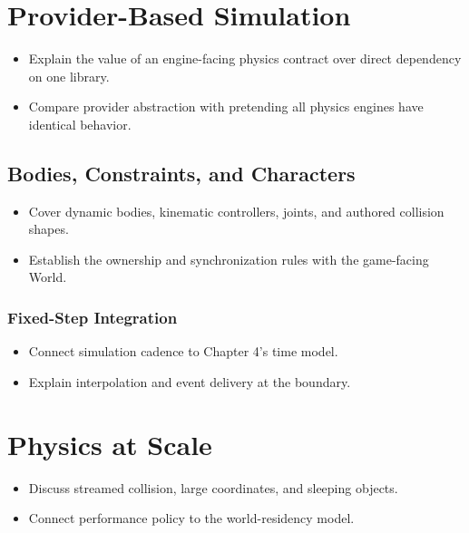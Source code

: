 \documentclass[
  11pt,
  letterpaper,
  DIV=11,
  numbers=noendperiod,
  twoside,
  open=right]{scrreprt}
\providecommand{\tightlist}{%
  \setlength{\itemsep}{0pt}\setlength{\parskip}{0pt}}
\begin{document}
\section{Provider-Based Simulation}\label{provider-based-simulation}

\begin{itemize}
\tightlist
\item
  Explain the value of an engine-facing physics contract over direct
  dependency on one library.
\item
  Compare provider abstraction with pretending all physics engines have
  identical behavior.
\end{itemize}

\subsection{Bodies, Constraints, and
Characters}\label{bodies-constraints-and-characters}

\begin{itemize}
\tightlist
\item
  Cover dynamic bodies, kinematic controllers, joints, and authored
  collision shapes.
\item
  Establish the ownership and synchronization rules with the game-facing
  World.
\end{itemize}

\subsubsection{Fixed-Step Integration}\label{fixed-step-integration}

\begin{itemize}
\tightlist
\item
  Connect simulation cadence to Chapter 4's time model.
\item
  Explain interpolation and event delivery at the boundary.
\end{itemize}

\section{Physics at Scale}\label{physics-at-scale}

\begin{itemize}
\tightlist
\item
  Discuss streamed collision, large coordinates, and sleeping objects.
\item
  Connect performance policy to the world-residency model.
\end{itemize}
\end{document}
